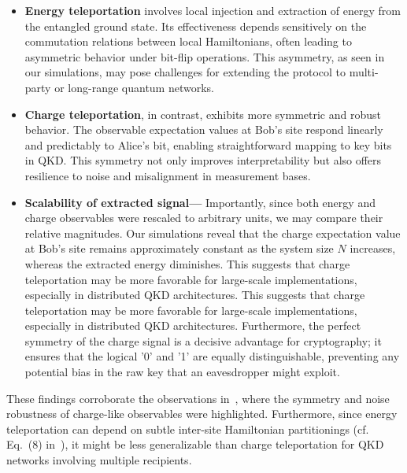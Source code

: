 \begin{itemize}
    \item \textbf{Energy teleportation} involves local injection and extraction of energy from the entangled ground state. Its effectiveness depends sensitively on the commutation relations between local Hamiltonians, often leading to asymmetric behavior under bit-flip operations. This asymmetry, as seen in our simulations, may pose challenges for extending the protocol to multi-party or long-range quantum networks.
    
    \item \textbf{Charge teleportation}, in contrast, exhibits more symmetric and robust behavior. The observable expectation values at Bob’s site respond linearly and predictably to Alice's bit, enabling straightforward mapping to key bits in QKD. This symmetry not only improves interpretability but also offers resilience to noise and misalignment in measurement bases.
    
    \item \textbf{Scalability of extracted signal—} Importantly, since both energy and charge observables were rescaled to arbitrary units, we may compare their relative magnitudes. Our simulations reveal that the charge expectation value at Bob’s site remains approximately constant as the system size \( N \) increases, whereas the extracted energy diminishes. This suggests that charge teleportation may be more favorable for large-scale implementations, especially in distributed QKD architectures.
    This suggests that charge teleportation may be more favorable for large-scale implementations, especially in distributed QKD architectures. Furthermore, the perfect symmetry of the charge signal is a decisive advantage for cryptography; it ensures that the logical '0' and '1' are equally distinguishable, preventing any potential bias in the raw key that an eavesdropper might exploit.
\end{itemize}

These findings corroborate the observations in~\cite{IkedaTeleportingCharge, QKDbyQET}, where the symmetry and noise robustness of charge-like observables were highlighted. Furthermore, since energy teleportation can depend on subtle inter-site Hamiltonian partitionings (cf. Eq.~(8) in~\cite{QKDbyQET}), it might be less generalizable than charge teleportation for QKD networks involving multiple recipients.

